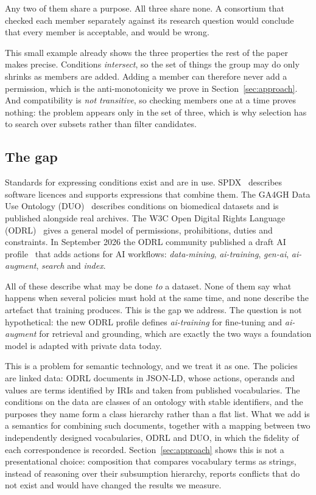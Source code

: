 \documentclass[sigconf,anonymous,review]{acmart}
\begin{document}
Any two of them share a purpose. All three share none. A consortium that checked
each member separately against its research question would conclude that every
member is acceptable, and would be wrong.

This small example already shows the three properties the rest of the paper makes
precise. Conditions \emph{intersect}, so the set of things the group may do only
shrinks as members are added. Adding a member can therefore never add a
permission, which is the anti-monotonicity we prove in
Section~\ref{sec:approach}. And compatibility is \emph{not transitive}, so
checking members one at a time proves nothing: the problem appears only in the
set of three, which is why selection has to search over subsets rather than
filter candidates.

\subsection{The gap}

Standards for expressing conditions exist and are in use.
SPDX~\cite{spdx} describes software licences and supports expressions that
combine them. The GA4GH Data Use Ontology (DUO)~\cite{duo} describes conditions
on biomedical datasets and is published alongside real archives. The W3C Open
Digital Rights Language (ODRL)~\cite{odrl-model,odrl-vocab} gives a general model
of permissions, prohibitions, duties and constraints. In September 2026 the ODRL
community published a draft AI profile~\cite{odrl-ai} that adds actions for AI
workflows: \emph{data-mining}, \emph{ai-training}, \emph{gen-ai},
\emph{ai-augment}, \emph{search} and \emph{index}.

All of these describe what may be done \emph{to} a dataset. None of them say what
happens when several policies must hold at the same time, and none describe the
artefact that training produces. This is the gap we address. The question is not
hypothetical: the new ODRL profile defines \emph{ai-training} for fine-tuning and
\emph{ai-augment} for retrieval and grounding, which are exactly the two ways a
foundation model is adapted with private data today.

This is a problem for semantic technology, and we treat it as one. The policies
are linked data: ODRL documents in JSON-LD, whose actions, operands and values
are terms identified by IRIs and taken from published vocabularies. The
conditions on the data are classes of an ontology with stable identifiers, and
the purposes they name form a class hierarchy rather than a flat list. What we
add is a semantics for combining such documents, together with a mapping between
two independently designed vocabularies, ODRL and DUO, in which the fidelity of
each correspondence is recorded. Section~\ref{sec:approach} shows this is not a
presentational choice: composition that compares vocabulary terms as strings,
instead of reasoning over their subsumption hierarchy, reports conflicts that do
not exist and would have changed the results we measure.
\end{document}

